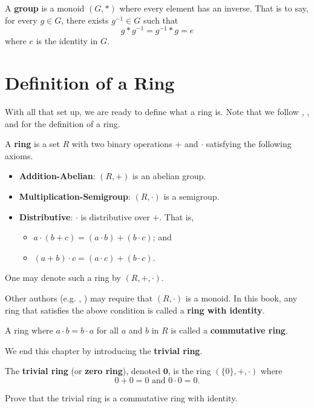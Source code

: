 \begin{definition}
    A \textbf{group} is a monoid $(G, \ast)$ where every element has an inverse. That is to say, for every $g \in G$, there exists $g^{-1} \in G$ such that
    \[
        g \ast g^{-1} = g^{-1} \ast g = e
    \]
    where $e$ is the identity in $G$.
\end{definition}

\section{Definition of a Ring}
With all that set up, we are ready to define what a ring is. Note that we follow \cite[p.~223]{dummit_foote_2004}, \cite[p.~115, Definition 1.1]{hungerford_1980}, and \cite{proofwiki_ringdefinition} for the definition of a ring.
\begin{definition}
    A \textbf{ring} is a set $R$ with two binary operations $+$ and $\cdot$ satisfying the following axioms.
    \begin{itemize}
        \item \textbf{Addition-Abelian}: $(R, +)$ is an abelian group.
        \item \textbf{Multiplication-Semigroup}: $(R, \cdot)$ is a semigroup.
        \item \textbf{Distributive}: $\cdot$ is distributive over $+$. That is,
        \begin{itemize}
            \item $a \cdot (b + c) = (a \cdot b) + (b \cdot c)$; and
            \item $(a + b) \cdot c = (a \cdot c) + (b \cdot c)$.
        \end{itemize}
    \end{itemize}
    One may denote such a ring by $(R, +, \cdot)$.
\end{definition}
\begin{remark}
    Other authors (e.g. \cite[p.~136]{cohn_1982}, \cite[pp.~145--146]{clark_1984}) may require that $(R, \cdot)$ is a monoid. In this book, any ring that satisfies the above condition is called a \textbf{ring with identity}.
\end{remark}
\begin{remark}
    A ring where $a \cdot b = b \cdot a$ for all $a$ and $b$ in $R$ is called a \textbf{commutative ring}.
\end{remark}

We end this chapter by introducing the \textbf{trivial ring}.
\begin{definition}
    The \textbf{trivial ring} (or \textbf{zero ring}), denoted $\textbf{0}$, is the ring $(\{0\}, +, \cdot)$ where
    \[
        0 + 0 = 0 \text{ and } 0 \cdot 0 = 0.    
    \]
\end{definition}
\begin{exercise}
    Prove that the trivial ring is a commutative ring with identity.
\end{exercise}

